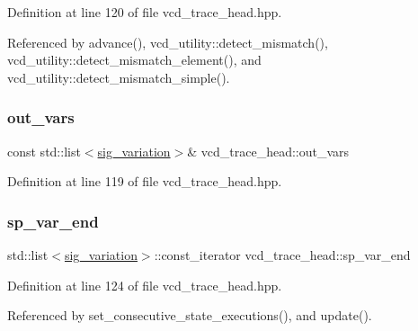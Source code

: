 Definition at line 120 of file vcd\+\_\+trace\+\_\+head.\+hpp.



Referenced by advance(), vcd\+\_\+utility\+::detect\+\_\+mismatch(), vcd\+\_\+utility\+::detect\+\_\+mismatch\+\_\+element(), and vcd\+\_\+utility\+::detect\+\_\+mismatch\+\_\+simple().

\mbox{\label{structvcd__trace__head_a4c40b23aa1c08f07ce05160a7d4e8a48}} 
\subsubsection{\texorpdfstring{out\+\_\+vars}{out\_vars}}
{\footnotesize\ttfamily const std\+::list$<$\hyperlink{structsig__variation}{sig\+\_\+variation}$>$\& vcd\+\_\+trace\+\_\+head\+::out\+\_\+vars}



Definition at line 119 of file vcd\+\_\+trace\+\_\+head.\+hpp.

\mbox{\label{structvcd__trace__head_a243e3e9502ce1ae7139cdbff5a827062}} 
\subsubsection{\texorpdfstring{sp\+\_\+var\+\_\+end}{sp\_var\_end}}
{\footnotesize\ttfamily std\+::list$<$\hyperlink{structsig__variation}{sig\+\_\+variation}$>$\+::const\+\_\+iterator vcd\+\_\+trace\+\_\+head\+::sp\+\_\+var\+\_\+end}



Definition at line 124 of file vcd\+\_\+trace\+\_\+head.\+hpp.



Referenced by set\+\_\+consecutive\+\_\+state\+\_\+executions(), and update().

\mbox{\label{structvcd__trace__head_ac4fbf68c61ede724a8b3bf1e31d4b476}} 
